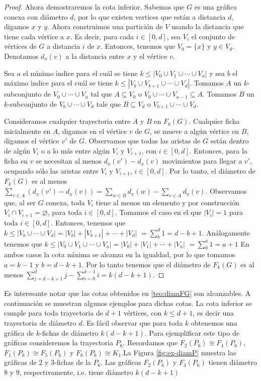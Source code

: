 \begin{proof}
Ahora demostraremos la cota inferior. Sabemos que $G$ es una gr\'afica conexa
con di\'ametro $d$, por lo que existen vertices que est\'an a distancia
$d$, digamos $x$ y $y$. Ahora construimos una partici\'on de $V$ usando  la
distancia que tiene cada v\'ertice a $x$. Es decir, para cada $i\in [0,d]$,
sea $V_{i}$ el conjunto de v\'ertices de $G$ a distancia $i$ de $x$. Entonces,
tenemos que $V_{0}=\{x\}$ y $y\in V_{d}$. Denotamos $d_x(v)$ a la distancia
entre $x$ y el v\'ertice $v$.

Sea $a$ el m\'\i{}nimo \'\i{}ndice para el cu\'al se tiene $k \leq |V_{0}\cup
V_{1}\cup \cdots \cup V_{a}|$ y sea $b$ el m\'aximo \'\i{}ndice para el cu\'al se
tiene $k\leq |V_{b}\cup V_{b+1}\cup \cdots \cup V_{d}|$. Tomamos $A$ un
$k$-subconjunto de $V_{0}\cup \cdots \cup V_{a}$  tal que $A\subseteq
V_{0}$ o $V_{0}\cup \cdots \cup V_{a-1}\subseteq A$. Tomamos $B$ un
$k$-subconjunto de $V_{b}\cup \cdots \cup V_{d}$ tale que
$B\subseteq V_{d}$ o $V_{b+1}\cup \cdots \cup V_{d}$. 

Consideramos cualquier trayectoria entre $A$ y $B$ en $F_{k}(G)$. Cualquier
ficha inicialmente en $A$, digamos en el v\'ertice $v$ de $G$, se mueve a
alg\'un v\'ertice en $B$, digamos el v\'ertice $v'$ de $G$. Observamos que todas
las aristas de $G$ est\'an dentro de alg\'un $V_{i}$ o a lo m\'as entre alg\'un
$V_{i}$ y $V_{i+1}$, con $i\in[0,d]$. Entonces, para la ficha en $v$ se
necesitan al menos $d_x(v')-d_x(v)$ movimientos para llegar a $v'$, ocupando
s\'olo las aristas entre $V_{i}$ y $V_{i+1}$, $i\in [0,d]$. Por lo tanto,
el di\'ametro de $F_{k}(G)$ es al menos $\sum_{v\in A}(d_x(v')-d_x(v))=
\sum_{w\in B}d_x(w)-\sum_{v\in A}d_x(v)$. Observamos que, al ser $G$ conexa,
toda $V_{i}$ tiene al menos un elemento y por construcci\'on $V_{i} \cap
V_{i+1}=\varnothing$, para toda $i\in [0,d]$. Tomamos el caso en el que
$|V_{i}|=1$ para toda $i\in [0,d]$. Entonces, tenemos que $k\leq
|V_{b}\cup\cdots\cup V_{d}|=|V_{b}|+|V_{b+1}|+\cdots +|V_d|$
$=\sum_{b}^{d}1 = d -b+1$. An\'alogamente tenemos que $k\leq
|V_{0}\cup V_{1}\cup \cdots \cup V_{a}|=|V_{0}|+|V_{1}|+\cdots + |V_{a}|$
$=\sum_{0}^{a} 1 = a+1$ En ambos casos la cota m\'\i{}nima se alcanza en la
igualdad, por lo que tomamos $a=k-1$ y $b=d-k+1$. Por lo tanto tenemos que
el di\'ametro de $F_{k}(G)$ es al menos $\sum_{j=d -k+1}^{d}j -
\sum_{i=0}^{k-1}i = k(d-k+1)$.
\end{proof}

Es interesante notar que las cotas obtenidos en \cref{teo:diamFG} son
alcanzables. A continuaci\'on se muestran algunos ejemplos para dichas cotas. La
cota inferior se cumple para toda trayectoria de $d +1$ v\'ertices, con $k \leq
d +1$, es decir una trayectoria de di\'ametro $d$. Es f\'acil observar que para
toda $k$ obtenemos una gr\'afica de $k$-fichas de di\'ametro $k(d-k+1)$. Para
ejemplificar este tipo de gr\'aficas consideremos la trayectoria $P_6$.
Recordamos que $F_2(P_6) \cong F_4(P_6)$, $F_1(P_6) \cong F_5(P_6)$ y $F_6(P_6)
\cong K_1$.La Figura \ref{fig:ex-diamP} muestra las gr\'aficas de $2$ y
$3$-fichas de la $P_6$. Las gr\'aficas $F_2(P_6)$ y $F_3(P_6)$ tienen di\'ametro
$8$ y $9$, respectivamente, i.e. tiene di\'ametro $k(d-k+1)$

